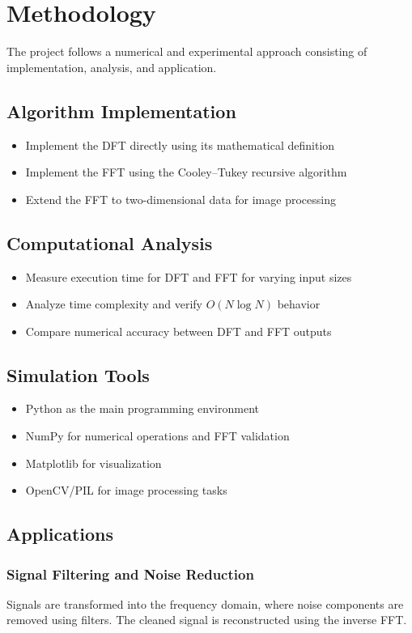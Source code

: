 \documentclass{zc-ust-hw}
\begin{document}
\section{Methodology}
The project follows a numerical and experimental approach consisting of implementation, analysis, and application.

\subsection{Algorithm Implementation}
\begin{itemize}
    \item Implement the DFT directly using its mathematical definition
    \item Implement the FFT using the Cooley--Tukey recursive algorithm
    \item Extend the FFT to two-dimensional data for image processing
\end{itemize}

\subsection{Computational Analysis}
\begin{itemize}
    \item Measure execution time for DFT and FFT for varying input sizes
    \item Analyze time complexity and verify \(O(N \log N)\) behavior
    \item Compare numerical accuracy between DFT and FFT outputs
\end{itemize}

\subsection{Simulation Tools}
\begin{itemize}
    \item Python as the main programming environment
    \item NumPy for numerical operations and FFT validation
    \item Matplotlib for visualization
    \item OpenCV/PIL for image processing tasks
\end{itemize}

\subsection{Applications}
\subsubsection{Signal Filtering and Noise Reduction}
Signals are transformed into the frequency domain, where noise components are removed using filters. The cleaned signal is reconstructed using the inverse FFT.
\end{document}
